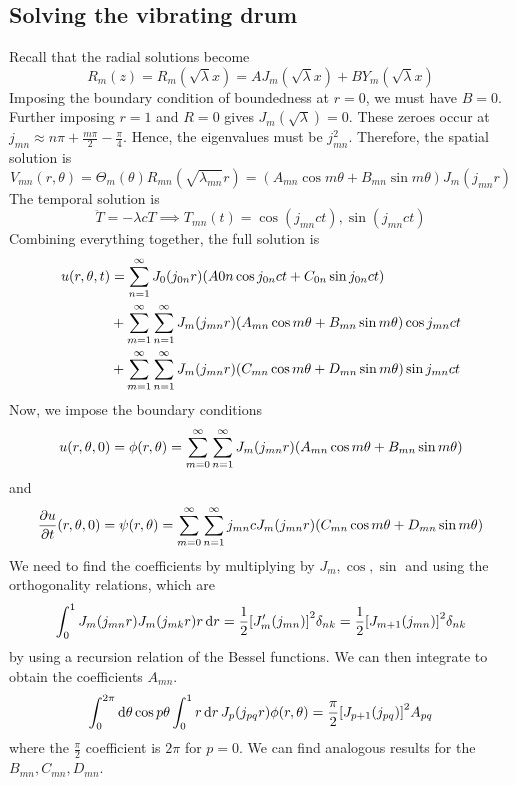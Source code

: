 \subsection{Solving the vibrating drum}
Recall that the radial solutions become
\[
	R_m(z) = R_m(\sqrt{\lambda} x) = A J_m(\sqrt{\lambda} x) + B Y_m(\sqrt{\lambda} x)
\]
Imposing the boundary condition of boundedness at \( r = 0 \), we must have \( B = 0 \).
Further imposing \( r = 1 \) and \( R = 0 \) gives \( J_m(\sqrt{\lambda}) = 0 \).
These zeroes occur at \( j_{mn} \approx n \pi + \frac{m \pi}{2} - \frac{\pi}{4} \).
Hence, the eigenvalues must be \( j^2_{mn} \).
Therefore, the spatial solution is
\[
	V_{mn}(r, \theta) = \Theta_m(\theta) R_{mn}(\sqrt{\lambda_{mn}} r) = (A_{mn} \cos m \theta + B_{mn} \sin m \theta) J_m (j_{mn} r)
\]
The temporal solution is
\[
	\ddot T = -\lambda c T \implies T_{mn}(t) = \cos(j_{mn} ct), \sin(j_{mn} ct)
\]
Combining everything together, the full solution is
\begin{align*}
	u(r,\theta,t) & = \sum_{n=1}^\infty J_0(j_{0n} r) \qty( A{0n}\cos j_{0n}ct + C_{0n}\sin j_{0n}ct )                                    \\
	              & + \sum_{m=1}^\infty \sum_{n=1}^\infty J_m (j_{mn}r) \qty( A_{mn} \cos m \theta + B_{mn} \sin m\theta ) \cos j_{mn} ct \\
	              & + \sum_{m=1}^\infty \sum_{n=1}^\infty J_m (j_{mn}r) \qty( C_{mn} \cos m \theta + D_{mn} \sin m\theta ) \sin j_{mn} ct
\end{align*}
Now, we impose the boundary conditions
\[
	u(r,\theta,0) = \phi(r,\theta) = \sum_{m=0}^\infty \sum_{n=1}^\infty J_m (j_{mn}r) \qty( A_{mn} \cos m \theta + B_{mn} \sin m\theta )
\]
and
\[
	\pdv{u}{t}\qty(r,\theta,0) = \psi(r,\theta) = \sum_{m=0}^\infty \sum_{n=1}^\infty j_{mn} c J_m (j_{mn}r) \qty( C_{mn} \cos m \theta + D_{mn} \sin m\theta )
\]
We need to find the coefficients by multiplying by \( J_m, \cos, \sin \) and using the orthogonality relations, which are
\[
	\int_0^1 J_m(j_{mn} r) J_m(j_{mk} r) r \dd{r} = \frac{1}{2}\qty[J_m'(j_{mn})]^2 \delta_{nk} = \frac{1}{2}\qty[J_{m+1}(j_{mn})]^2 \delta_{nk}
\]
by using a recursion relation of the Bessel functions.
We can then integrate to obtain the coefficients \( A_{mn} \).
\[
	\int_0^{2\pi} \dd{\theta} \cos p\theta \int_0^1 r \dd{r} J_p(j_{pq} r) \phi(r,\theta) = \frac{\pi}{2}\qty[J_{p+1}(j_{pq})]^2 A_{pq}
\]
where the \( \frac{\pi}{2} \) coefficient is \( 2\pi \) for \( p = 0 \).
We can find analogous results for the \( B_{mn}, C_{mn}, D_{mn} \).
